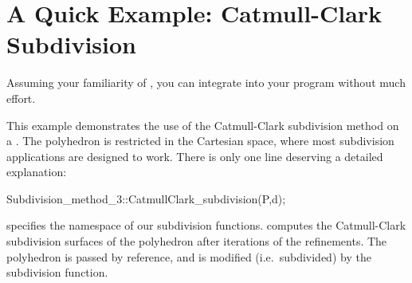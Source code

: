 




\section{A Quick Example: Catmull-Clark Subdivision}
\label{secFirstSub}
Assuming your familiarity of ,
you can integrate  into your program 
without much effort.


This example demonstrates the use of the Catmull-Clark subdivision method
on a . The polyhedron is restricted in the Cartesian
space, where most subdivision applications are designed to work.
There is only one line deserving a detailed explanation:
\begin{ccExampleCode}
Subdivision_method_3::CatmullClark_subdivision(P,d);
\end{ccExampleCode}
 specifies the namespace of our
subdivision functions.  computes the 
Catmull-Clark subdivision surfaces of the polyhedron  after
 iterations of the refinements. The polyhedron  is 
passed by reference, and is modified (i.e.~subdivided) by the 
subdivision function.


